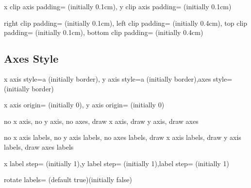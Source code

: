 \documentclass{ltxdoc}
\begin{document}
\begin{sseqdata}[name=ex1,degree={#1}{1-#1}]
\begin{keylist}
\end{keylist}

\begin{keylist}{x clip axis padding= (initially 0.1cm), y clip axis padding= (initially 0.1cm)}

\end{keylist}

\begin{keylist}{right clip padding= (initially 0.1cm), left clip padding= (initially 0.4cm),
                top clip padding= (initially 0.1cm), bottom clip padding= (initially 0.4cm)}

\end{keylist}


\subsection{Axes Style}

\begin{keylist}{x axis style=a (initially border), y axis style=a (initially border),axes style= (initially border)}

\end{keylist}

\begin{keylist}{x axis origin= (initially 0), y axis origin= (initially 0)}

\end{keylist}

\begin{keylist}{no x axis, no y axis, no axes, draw x axis, draw y axis, draw axes}

\end{keylist}

\begin{keylist}{no x axis labels, no y axis labels, no axes labels, draw x axis labels, draw y axis labels, draw axes labels}

\end{keylist}

\begin{keylist}{x label step= (initially 1),y label step= (initially 1),label step= (initially 1)}

\end{keylist}

\begin{key}{rotate labels= (default true)(initially false)}

\end{key}


\end{sseqdata}
\end{document}
